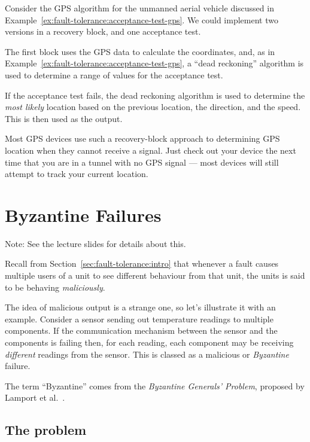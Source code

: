 \begin{example}
Consider the GPS algorithm for the unmanned aerial vehicle discussed in Example~\ref{ex:fault-tolerance:acceptance-test-gps}. We could implement two versions in a recovery block, and one acceptance test.

The first block uses the GPS data to calculate the coordinates, and, as in Example~\ref{ex:fault-tolerance:acceptance-test-gps}, a ``dead reckoning'' algorithm is used to determine a range of values for the acceptance test.

If the acceptance test fails, the dead reckoning algorithm is used to determine the \emph{most likely} location based on the previous location, the direction, and the speed. This is then used as the output.

 Most GPS devices use such a recovery-block approach to determining GPS location when they cannot receive a signal. Just check out your device the next time that you are in a tunnel with no GPS signal --- most devices will still attempt to track your current location.

\end{example}


\section{Byzantine Failures}

Note: See the lecture slides for details about this.

Recall from Section~\ref{sec:fault-tolerance:intro} that whenever a fault  causes multiple users of a unit to see different behaviour from that unit, the units is said to be behaving \emph{maliciously}. 

The idea of malicious output is a strange one, so let's illustrate it with an example. Consider a sensor sending out temperature readings to multiple components. If the communication mechanism between the sensor and the components is failing then, for each reading, each component may be receiving \emph{different} readings from the sensor. This is classed as a malicious or \emph{Byzantine} failure.

The term ``Byzantine'' comes from the \emph{Byzantine Generals' Problem}, proposed by Lamport et al.\ \cite{lamport82}.

\subsection{The problem}


